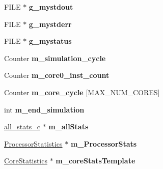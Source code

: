 \begin{DoxyCompactItemize}
\item 
\hypertarget{classmacsim__c_abbcb39b02a5aa5ce643e36895c6d8c37}{
FILE $\ast$ {\bfseries g\_\-mystdout}}
\label{classmacsim__c_abbcb39b02a5aa5ce643e36895c6d8c37}

\item 
\hypertarget{classmacsim__c_a86a27ed08fa959dd2a7bcbfacf6e00c9}{
FILE $\ast$ {\bfseries g\_\-mystderr}}
\label{classmacsim__c_a86a27ed08fa959dd2a7bcbfacf6e00c9}

\item 
\hypertarget{classmacsim__c_aff0e8865bea89a3c8fe139cdbb1ea8db}{
FILE $\ast$ {\bfseries g\_\-mystatus}}
\label{classmacsim__c_aff0e8865bea89a3c8fe139cdbb1ea8db}

\item 
\hypertarget{classmacsim__c_aa30d75ca4f8ab199477e12ce0e170bb8}{
Counter {\bfseries m\_\-simulation\_\-cycle}}
\label{classmacsim__c_aa30d75ca4f8ab199477e12ce0e170bb8}

\item 
\hypertarget{classmacsim__c_a053cffe61bc44edcf0da911d7a3f685a}{
Counter {\bfseries m\_\-core0\_\-inst\_\-count}}
\label{classmacsim__c_a053cffe61bc44edcf0da911d7a3f685a}

\item 
\hypertarget{classmacsim__c_aa13b8cc432a7611f777e81d06ee46fda}{
Counter {\bfseries m\_\-core\_\-cycle} \mbox{[}MAX\_\-NUM\_\-CORES\mbox{]}}
\label{classmacsim__c_aa13b8cc432a7611f777e81d06ee46fda}

\item 
\hypertarget{classmacsim__c_adfc39eb2e3820c3ae1338bd191c0a7e8}{
int {\bfseries m\_\-end\_\-simulation}}
\label{classmacsim__c_adfc39eb2e3820c3ae1338bd191c0a7e8}

\item 
\hypertarget{classmacsim__c_a721ddb554f496c47e86f68e0ec5bff71}{
\hyperlink{classall__stats__c}{all\_\-stats\_\-c} $\ast$ {\bfseries m\_\-allStats}}
\label{classmacsim__c_a721ddb554f496c47e86f68e0ec5bff71}

\item 
\hypertarget{classmacsim__c_adae560b3d39021be0e86876a73c2c314}{
\hyperlink{classProcessorStatistics}{ProcessorStatistics} $\ast$ {\bfseries m\_\-ProcessorStats}}
\label{classmacsim__c_adae560b3d39021be0e86876a73c2c314}

\item 
\hypertarget{classmacsim__c_a2f33380a1304c84257d50332ca180ae1}{
\hyperlink{classCoreStatistics}{CoreStatistics} $\ast$ {\bfseries m\_\-coreStatsTemplate}}
\label{classmacsim__c_a2f33380a1304c84257d50332ca180ae1}


\end{DoxyCompactItemize}
